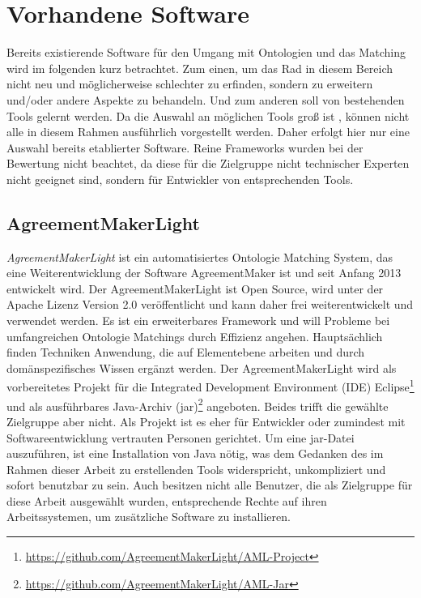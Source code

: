 %
\chapter{Vorhandene Software}
\label{chap:existingSoftware}
		
		Bereits existierende Software für den Umgang mit Ontologien und das Matching
		wird im folgenden kurz betrachtet. Zum einen, um das Rad in diesem Bereich
		nicht neu und möglicherweise schlechter zu erfinden, sondern zu erweitern und/oder andere Aspekte zu behandeln. Und zum anderen soll von
		bestehenden Tools gelernt werden. Da die Auswahl an möglichen Tools groß ist
		\cite{Ber14}\cite{Shv13}\cite{Eng08}, können nicht alle in diesem Rahmen
		ausführlich vorgestellt werden. Daher erfolgt hier nur eine Auswahl bereits
		etablierter Software.
		Reine Frameworks wurden bei der Bewertung nicht beachtet, da diese für die
		Zielgruppe nicht technischer Experten nicht geeignet sind, sondern für
		Entwickler von entsprechenden Tools.
		
		\section{AgreementMakerLight}
		\textit{AgreementMakerLight} ist ein automatisiertes Ontologie Matching System,
		das eine Weiterentwicklung der Software AgreementMaker ist und seit Anfang
		2013 entwickelt wird. Der AgreementMakerLight ist Open Source, wird unter der
		Apache Lizenz Version 2.0 veröffentlicht und kann daher frei weiterentwickelt
		und verwendet werden. Es ist ein erweiterbares Framework und will Probleme bei
		umfangreichen Ontologie Matchings durch Effizienz angehen. Hauptsächlich
		finden Techniken Anwendung, die auf Elementebene arbeiten und durch
		domänspezifisches Wissen ergänzt werden.
		Der AgreementMakerLight wird als vorbereitetes Projekt für die Integrated
		Development Environment (IDE)
		Eclipse\footnote{\url{https://github.com/AgreementMakerLight/AML-Project}} und
		als ausführbares Java-Archiv
		(jar)\footnote{\url{https://github.com/AgreementMakerLight/AML-Jar}}
		angeboten. Beides trifft die gewählte Zielgruppe aber nicht.
		Als Projekt ist es eher für Entwickler oder zumindest mit Softwareentwicklung
		vertrauten Personen gerichtet. Um eine jar-Datei auszuführen, ist eine
		Installation von Java nötig, was dem Gedanken des im Rahmen dieser Arbeit zu
		erstellenden Tools widerspricht, unkompliziert und sofort benutzbar zu sein.
		Auch besitzen nicht alle Benutzer, die als Zielgruppe für diese Arbeit
		ausgewählt wurden, entsprechende Rechte auf ihren Arbeitssystemen, um
		zusätzliche Software zu installieren.
		
